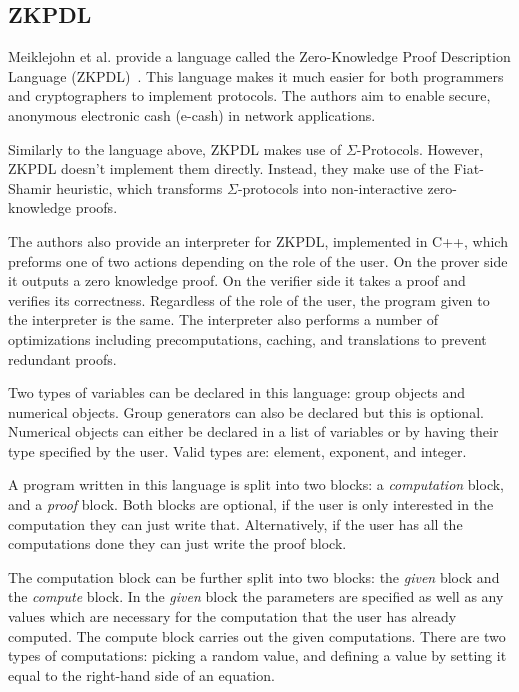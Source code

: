 \documentclass{sig-alternate}
\begin{document}
	\subsection{ZKPDL}
		Meiklejohn et al. provide a language called the Zero-Knowledge Proof Description
		Language (ZKPDL)~\cite{ZKPDL:2010}. This language makes it much easier for both
		programmers and cryptographers to implement protocols. The authors aim to enable
		secure, anonymous electronic cash (e-cash) in network applications.
		
		Similarly to the language above, ZKPDL makes use of $\Sigma$-Protocols.
		However, ZKPDL doesn't implement them directly. Instead, they make use of the 
		Fiat-Shamir heuristic, which transforms $\Sigma$-protocols into non-interactive
		zero-knowledge proofs. 
		
		The authors also provide an interpreter for ZKPDL, implemented in C++, which
		preforms one of two actions depending on the role of the user. On the prover
		side it outputs a zero knowledge proof. On the verifier side it takes a proof
		and verifies its correctness. Regardless of the role of the user, the program
		given to the interpreter is the same. The interpreter also performs a number of
		optimizations including precomputations, caching, and translations to prevent
		redundant proofs. 

		Two types of variables can be declared in this language: group objects
		and numerical objects. Group generators can also be declared but this 
		is optional. Numerical objects can either be declared in a list of variables
		or by having their type specified by the user. Valid types are: element,
		exponent, and integer.
		
		A program written in this language is split into two blocks: a \textit{computation} block,
		and a \textit{proof} block. Both blocks are optional, if the user is only interested in the
		computation they can just write that. Alternatively, if the user has all the computations
		done they can just write the proof block. 
		
		The computation block can be further split into two blocks: the \textit{given} block
		and the \textit{compute} block. In the \textit{given} block the parameters are specified
		as well as any values which are necessary for the computation that the user has already
		computed. The compute block carries out the given computations. There are two
		types of computations: picking a random value, and defining a value by setting it
		equal to the right-hand side of an equation.
		
\end{document}
